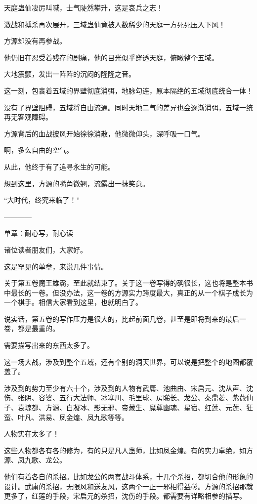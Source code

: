 \begin{this_body}
天庭蛊仙凄厉叫喊，士气陡然攀升，这是哀兵之志！

激战和搏杀再次展开，三域蛊仙竟被人数稀少的天庭一方死死压入下风！

方源却没有再参战。

他仍旧在忍受着残存的剧痛，他的目光似乎穿透天庭，俯瞰整个五域。

大地震颤，发出一阵阵的沉闷的隆隆之音。

这一刻，包裹着五域的界壁彻底消弭，地脉勾连，原本隔绝的五域彻底统合一体！

没有了界壁阻碍，五域将自由流通。同时天地二气的差异也会逐渐消弭，五域一统再无客观障碍。

方源背后的血战披风开始徐徐消散，他微微仰头，深呼吸一口气。

啊，多么自由的空气。

从此，他终于有了追寻永生的可能。

想到这里，方源的嘴角微翘，流露出一抹笑意。

“大时代，终究来临了！”

------------

单章：耐心写，耐心读

诸位读者朋友们，大家好。

这是罕见的单章，来说几件事情。

关于第五卷魔王雄霸，至此就结束了。关于这一卷写得的确很长，这也将是整本书中最长的一卷。但没办法，这一卷的方源实力跨度最大，真正的从一个棋子成长为一个棋手。相信大家看到这里，也就明白了。

说实话，第五卷的写作压力是很大的，比起前面几卷，甚至是即将到来的最后一卷，都是最重的。

需要描写出来的东西太多了。

这一场大战，涉及到整个五域，还有个别的洞天世界，可以说是把整个的地图都覆盖了。

涉及到的势力至少有六十个，涉及到的人物有武庸、池曲由、宋启元、沈从声、沈伤、张阴、容婆、五行大法师、冰塞川、毛里球、房睇长、龙公、秦鼎菱、紫薇仙子、袁琼都、方源、白凝冰、影无邪、帝藏生、魔尊幽魂、星宿、红莲、元莲、狂蛮、叶凡、洪易、凤金煌、凤九歌等等。

人物实在太多了！

这些人物都各有各的修为，有的只是凡人蛊师，比如凤金煌。有的实力卓绝，如方源、凤九歌、龙公。

他们有着各自的杀招。比如龙公的两套战斗体系，十几个杀招，都切合他的形象的设计。武庸的杀招，无限风和送友风，这两个一正一邪相得益彰。方源的杀招那就更多了，红莲的手段，宋启元的杀招，沈伤的手段。都需要有详略相参的描写。


\end{this_body}

